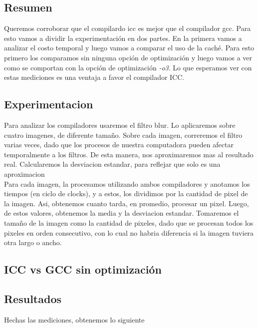 \subsection{Resumen}
Queremos corroborar que el compilardo icc es mejor que el compilador gcc. Para esto vamos a dividir la experimentación en dos partes. En la primera vamos a analizar el costo temporal y luego vamos a comparar el uso de la caché.
Para esto primero los comparamos sin ninguna opción de optimización y luego vamos a ver como se comportan con la opción de optimización \textit{-o3}. Lo que esperamos ver con estas mediciones es una ventaja a favor el compilador ICC.



\subsection{Experimentacion}
Para analizar los compiladores usaremos el filtro blur. Lo aplicaremos sobre cuatro imagenes, de diferente tamaño. Sobre cada imagen, correremos el filtro varias veces, dado que los procesos de nuestra computadora pueden afectar temporalmente a los filtros. De esta manera, nos aproximaremos mas al resultado real. Calcularemos la desviacion estandar, para reflejar que solo es una aproximacion \\
Para cada imagen, la procesamos utilizando ambos compiladores y anotamos los tiempos (en ciclo de clocks), y a estos, los dividimos por la cantidad de pixel de la imagen. Asi, obtenemos cuanto tarda, en promedio, procesar un pixel. Luego, de estos valores, obtenemos la media y la desviacion estandar. Tomaremos el tamaño de la imagen como la cantidad de pixeles, dado que se procesan todos los pixeles en orden consecutivo, con lo cual no habria diferencia si la imagen tuviera otra largo o ancho.

\subsection{ICC vs GCC sin optimización}

\subsection{Resultados}
Hechas las mediciones, obtenemos lo siguiente

